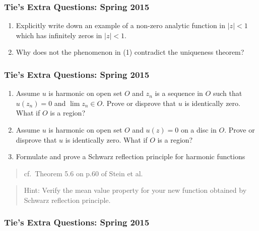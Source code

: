 \hypertarget{ties-extra-questions-spring-2015-7}{%
\subsubsection{Tie's Extra Questions: Spring
2015}\label{ties-extra-questions-spring-2015-7}}

\begin{enumerate}
\def\labelenumi{(\arabic{enumi})}
\item
  Explicitly write down an example of a non-zero analytic function in
  \(|z|<1\) which has infinitely zeros in \(|z|<1\).
\item
  Why does not the phenomenon in (1) contradict the uniqueness theorem?
\end{enumerate}

\hypertarget{ties-extra-questions-spring-2015-8}{%
\subsubsection{Tie's Extra Questions: Spring
2015}\label{ties-extra-questions-spring-2015-8}}

\begin{enumerate}
\def\labelenumi{(\arabic{enumi})}
\item
  Assume \(u\) is harmonic on open set \(O\) and \(z_n\) is a sequence
  in \(O\) such that \(u(z_n) = 0\) and \(\lim z_n \in O\). Prove or
  disprove that \(u\) is identically zero. What if \(O\) is a region?
\item
  Assume \(u\) is harmonic on open set \(O\) and \(u(z) = 0\) on a disc
  in \(O\). Prove or disprove that \(u\) is identically zero. What if
  \(O\) is a region?
\item
  Formulate and prove a Schwarz reflection principle for harmonic
  functions
\end{enumerate}

\begin{quote}
cf.~Theorem 5.6 on p.60 of Stein et al.
\end{quote}

\begin{quote}
Hint: Verify the mean value property for your new function obtained by
Schwarz reflection principle.
\end{quote}

\hypertarget{ties-extra-questions-spring-2015-9}{%
\subsubsection{Tie's Extra Questions: Spring
2015}\label{ties-extra-questions-spring-2015-9}}

